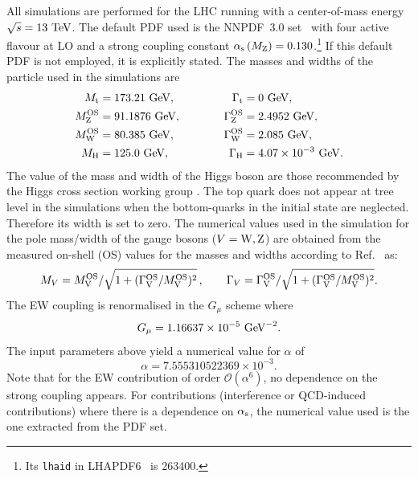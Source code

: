 \documentclass[11pt]{cernrep}
\begin{document}
All simulations are performed for the LHC running with a center-of-mass energy $\sqrt s = 13 {\rm~TeV}$.
The default PDF used is the NNPDF~3.0 set~\cite{Ball:2014uwa} with four active flavour at LO and a strong coupling constant $\alpha_{\rm s}\left( M_{\rm Z} \right) = 0.130$.\footnote{Its {\tt lhaid} in LHAPDF6~\cite{Buckley:2014ana} is 263400.} 
If this default PDF is not employed, it is explicitly stated.
%
The masses and widths of the particle used in the simulations are
%
\begin{alignat}{2}
                M_{\rm t}   &=  173.21 {\rm~GeV},             & \quad \quad \quad \Gamma_{\rm t} &= 0 {\rm~GeV},  \nonumber \\
                M_{\rm Z}^{\rm OS} &=  91.1876{\rm~GeV},      & \quad \quad \quad \Gamma^{\rm OS}_{\rm Z} &= 2.4952{\rm~GeV},  \nonumber \\
                M_{\rm W}^{\rm OS} &=  80.385{\rm~GeV},       & \Gamma^{\rm OS}_{\rm W} &= 2.085{\rm~GeV},  \nonumber \\
                M_{\rm H} &=  125.0{\rm~GeV}, 		      & \Gamma_{\rm H}   &=  4.07 \times 10^{-3}{\rm~GeV}.
\end{alignat}
%
The value of the mass and width of the Higgs boson are those recommended by the Higgs cross section working group \cite{deFlorian:2016spz}.
The top quark does not appear at tree level in the simulations when the bottom-quarks in the initial state are neglected.
Therefore its width is set to zero.
The numerical values used in the simulation for the pole mass/width of the gauge bosons ($V={\rm W,Z}$) are obtained from the measured on-shell (OS) values for the masses and widths according to Ref.~\cite{Bardin:1988xt} as:
%
\begin{equation}
        M_V = M_{\rm V}^{\rm OS}/\sqrt{1+(\Gamma_{\rm V}^{\rm OS}/M_{\rm V}^{\rm OS})^2}\,,\qquad  \Gamma_V = \Gamma_{\rm V}^{\rm OS}/\sqrt{1+(\Gamma_{\rm V}^{\rm OS}/M_{\rm V}^{\rm OS})^2}.
\end{equation}
%
The EW coupling is renormalised in the $G_\mu$ scheme \cite{Denner:2000bj} where
%
\begin{equation}
    G_{\mu}    = 1.16637\times 10^{-5}{\rm~GeV}^{-2}.
\end{equation}
%
The input parameters above yield a numerical value for $\alpha$ of
%
\begin{equation}
 \alpha = 7.555310522369 \times 10^{-3}.
\end{equation}
%
Note that for the EW contribution of order $\mathcal{O} (\alpha^6)$, no dependence on the strong coupling appears.
For contributions (interference or QCD-induced contributions) where there is a dependence on $\alpha_{\rm s}$, the numerical value used is the one extracted from the PDF set.
\end{document}

